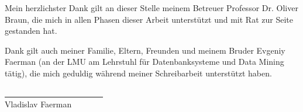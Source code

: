 Mein herzlichster Dank gilt an dieser Stelle meinem Betreuer Professor Dr. Oliver Braun, die mich in allen Phasen dieser Arbeit unterstützt und mit Rat zur Seite gestanden hat.

Dank gilt auch meiner Familie, Eltern, Freunden und meinem Bruder Evgeniy Faerman (an der LMU am Lehrstuhl für Datenbanksysteme und Data Mining tätig), die mich geduldig während meiner Schreibarbeit unterstützt haben.
\vskip 1.5cm

\underline{~~~~~~~~~~~~~~~~~~~~~~~~}\\
Vladislav Faerman\\

 